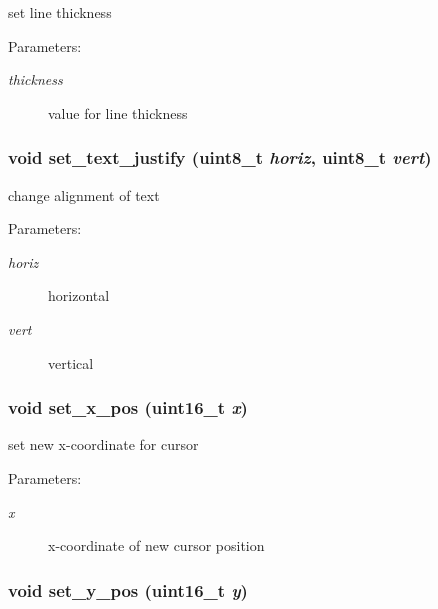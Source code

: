 set line thickness 

\begin{Desc}
\item[Parameters:]
\begin{description}
\item[{\em thickness}]value for line thickness \end{description}
\end{Desc}
\hypertarget{group__hgdi__api_gc5a88037655557ae99d1f1144c021f61}{
\subsubsection[{set\_\-text\_\-justify}]{\setlength{\rightskip}{0pt plus 5cm}void set\_\-text\_\-justify (uint8\_\-t {\em horiz}, \/  uint8\_\-t {\em vert})}}
\label{group__hgdi__api_gc5a88037655557ae99d1f1144c021f61}


change alignment of text 

\begin{Desc}
\item[Parameters:]
\begin{description}
\item[{\em horiz}]horizontal \item[{\em vert}]vertical \end{description}
\end{Desc}
\hypertarget{group__hgdi__api_g8d443553cf6cc32ecaffc97696150b03}{
\subsubsection[{set\_\-x\_\-pos}]{\setlength{\rightskip}{0pt plus 5cm}void set\_\-x\_\-pos (uint16\_\-t {\em x})}}
\label{group__hgdi__api_g8d443553cf6cc32ecaffc97696150b03}


set new x-coordinate for cursor 

\begin{Desc}
\item[Parameters:]
\begin{description}
\item[{\em x}]x-coordinate of new cursor position \end{description}
\end{Desc}
\hypertarget{group__hgdi__api_ge36f0ada44131f77cd99aac2e1945cc4}{
\subsubsection[{set\_\-y\_\-pos}]{\setlength{\rightskip}{0pt plus 5cm}void set\_\-y\_\-pos (uint16\_\-t {\em y})}}
\label{group__hgdi__api_ge36f0ada44131f77cd99aac2e1945cc4}


